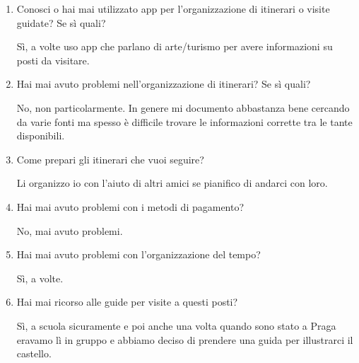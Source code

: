 \begin{enumerate}

\item Conosci o hai mai utilizzato app per l'organizzazione di itinerari o visite guidate? Se sì quali?

Sì, a volte uso app che parlano di arte/turismo per avere informazioni su posti da visitare.

\item Hai mai avuto problemi nell'organizzazione di itinerari? Se sì quali?

No, non particolarmente. In genere mi documento abbastanza bene cercando da varie fonti ma spesso è difficile trovare le informazioni corrette tra le tante disponibili.

\item Come prepari gli itinerari che vuoi seguire?

Li organizzo io con l'aiuto di altri amici se pianifico di andarci con loro.

\item Hai mai avuto problemi con i metodi di pagamento?

No, mai avuto problemi.

\item Hai mai avuto problemi con l'organizzazione del tempo?

Sì, a volte.

\item Hai mai ricorso alle guide per visite a questi posti?

Sì, a scuola sicuramente e poi anche una volta quando sono stato a Praga eravamo lì in gruppo e abbiamo deciso di prendere una guida per illustrarci il castello.

\end{enumerate}


\markright{}